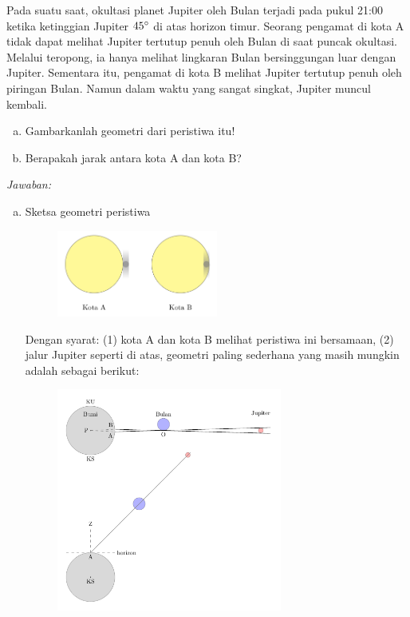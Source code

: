 \documentclass[11pt,fleqn, a4paper]{exam}
\begin{document}
\begin{questions}
\vspace{0.5cm}
\question Pada suatu saat, okultasi planet Jupiter oleh Bulan terjadi pada pukul 21:00 ketika ketinggian Jupiter $45\degree$ di atas horizon timur. Seorang pengamat di kota A tidak dapat melihat Jupiter tertutup penuh oleh Bulan di saat puncak okultasi. Melalui teropong, ia hanya melihat lingkaran Bulan bersinggungan luar dengan Jupiter. Sementara itu, pengamat di kota B melihat Jupiter tertutup penuh oleh piringan Bulan. Namun dalam waktu yang sangat singkat, Jupiter muncul kembali.
\begin{enumerate}[(a)]
\item Gambarkanlah geometri dari peristiwa itu!
\item Berapakah jarak antara kota A dan kota B?
\end{enumerate}

\textit{Jawaban:}

\begin{enumerate}[(a)]
\item Sketsa geometri peristiwa
\begin{figure}[H]
\centering
\includegraphics[width=0.5\textwidth]{gambar/moonJup.png}
\end{figure}
Dengan syarat: (1) kota A dan kota B melihat peristiwa ini bersamaan, (2) jalur Jupiter seperti di atas, geometri paling sederhana yang masih mungkin adalah sebagai berikut:
\begin{figure}[H]
\centering
\includegraphics[width=0.7\textwidth]{gambar/moonJup2.pdf}
\end{figure}


\end{enumerate}
\end{questions}
\end{document}
